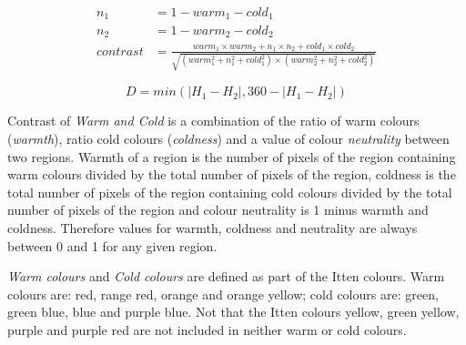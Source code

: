 \documentclass[11pt,a4paper,twoside,openright]{report}
\begin{document}
\begin{figure}[!htb]
\begin{equation}
\begin{aligned}
n_1       &= 1 - warm_1 - cold_1 \\
n_2       &= 1 - warm_2 - cold_2 \\
contrast  &= \frac{ warm_1 \times warm_2
                   + n_1    \times n_2
                   + cold_1 \times cold_2
                  }{ \sqrt{      (warm_1^2 + n_1^2 + cold_1^2)
                          \times (warm_2^2 + n_2^2 + cold_2^2) } }
\label{eq:mach}
\end{aligned}
\end{equation}
\end{figure}

\begin{figure}[!htb]
\begin{equation}
D = min( \lvert H_1 - H_2 \rvert , 360 - \lvert H_1 - H_2 \rvert )
\label{eq:wheel}
\end{equation}
\end{figure}

Contrast of \emph{Warm and Cold} is a combination of the ratio of warm colours
(\emph{warmth}), ratio cold colours (\emph{coldness}) and a value of colour
\emph{neutrality} between two regions.  Warmth of a region is the number of
pixels of the region containing warm colours divided by the total number of
pixels of the region, coldness is the total number of pixels of the region
containing cold colours divided by the total number of pixels of the region and
colour neutrality is 1 minus warmth and coldness.  Therefore values for warmth,
coldness and neutrality are always between 0 and 1 for any given region.

\emph{Warm colours} and \emph{Cold colours} are defined as part of the Itten
colours.  Warm colours are: red, range red, orange and orange yellow; cold
colours are: green, green blue, blue and purple blue.  Not that the Itten
colours yellow, green yellow, purple and purple red are not included in neither
warm or cold colours.
\end{document}

